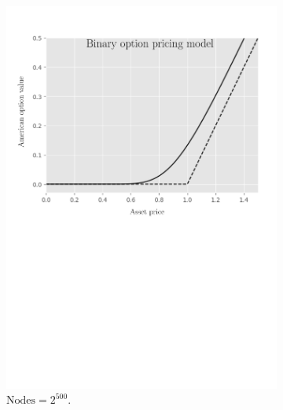 \begin{figure}[H]
  \centering
  \begin{subfigure}{0.4\textwidth}
    \centering
    \includegraphics[width=\textwidth]{chapters/chapter3/TestCase1BOPM.pdf}
    \caption{$\text{Nodes} = 2^{500}$.}
    \label{fig:lcp:numericaresults:numericaresults:test_case_1_bopm}
  \end{subfigure}
  \hspace{0.5cm}
  \begin{subfigure}{0.4\textwidth}
    \centering

\end{subfigure}
\end{figure}
